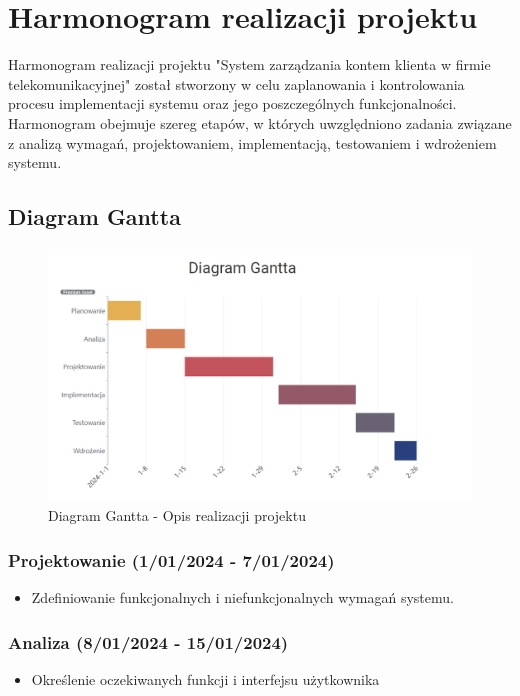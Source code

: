 ﻿%
\chapter{Harmonogram realizacji projektu}

Harmonogram realizacji projektu "System zarządzania kontem klienta w firmie telekomunikacyjnej" został stworzony w celu zaplanowania i kontrolowania procesu implementacji systemu oraz jego poszczególnych funkcjonalności. Harmonogram obejmuje szereg etapów, w których uwzględniono zadania związane z analizą wymagań, projektowaniem, implementacją, testowaniem i wdrożeniem systemu.

\section{Diagram Gantta}
\begin{figure}[h]
    \centering
    \includegraphics[width=\textwidth]{Gantt.png}
      \caption{Diagram Gantta - Opis realizacji projektu}
    \label{fig:example}
\end{figure}

\newpage

\subsection{Projektowanie (1/01/2024 - 7/01/2024)}
\begin{itemize}
    \item Zdefiniowanie funkcjonalnych i niefunkcjonalnych wymagań systemu.

\end{itemize}

\subsection{Analiza (8/01/2024 - 15/01/2024)}
\begin{itemize}
    \item Określenie oczekiwanych funkcji i interfejsu użytkownika
\end{itemize}

